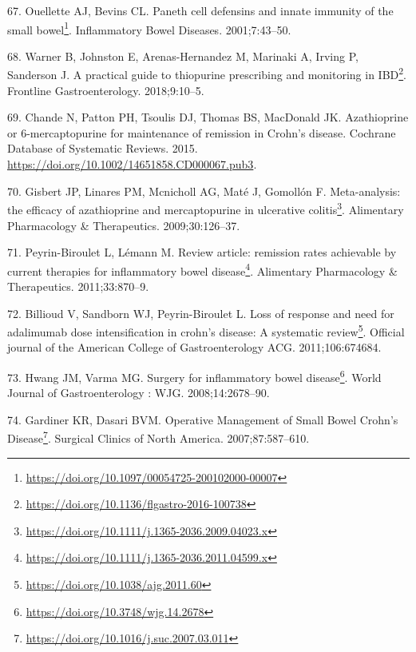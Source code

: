 \documentclass[
  12pt,
  a4paper,
  twoside,
  openright]{book}
\DeclareRobustCommand{\href}[2]{#2\footnote{\url{#1}}}
\newlength{\cslhangindent}
\newlength{\cslentryspacingunit} %
\newenvironment{CSLReferences}[2] %
 {%
  \setlength{\parindent}{0pt}
  \ifodd #1
  \let\oldpar\par
  \def\par{\hangindent=\cslhangindent\oldpar}
  \fi
  \setlength{\parskip}{#2\cslentryspacingunit}
 }%
 {}
\begin{document}
\begin{CSLReferences}{0}{0}
\leavevmode{}%
67. Ouellette AJ, Bevins CL. \href{https://doi.org/10.1097/00054725-200102000-00007}{Paneth cell defensins and innate immunity of the small bowel}. Inflammatory Bowel Diseases. 2001;7:43--50.

\leavevmode{}%
68. Warner B, Johnston E, Arenas-Hernandez M, Marinaki A, Irving P, Sanderson J. \href{https://doi.org/10.1136/flgastro-2016-100738}{A practical guide to thiopurine prescribing and monitoring in IBD}. Frontline Gastroenterology. 2018;9:10--5.

\leavevmode{}%
69. Chande N, Patton PH, Tsoulis DJ, Thomas BS, MacDonald JK. Azathioprine or 6{-}mercaptopurine for maintenance of remission in Crohn's disease. Cochrane Database of Systematic Reviews. 2015. \url{https://doi.org/10.1002/14651858.CD000067.pub3}.

\leavevmode{}%
70. Gisbert JP, Linares PM, Mcnicholl AG, Maté J, Gomollón F. \href{https://doi.org/10.1111/j.1365-2036.2009.04023.x}{Meta-analysis: the efficacy of azathioprine and mercaptopurine in ulcerative colitis}. Alimentary Pharmacology \& Therapeutics. 2009;30:126--37.

\leavevmode{}%
71. Peyrin-Biroulet L, Lémann M. \href{https://doi.org/10.1111/j.1365-2036.2011.04599.x}{Review article: remission rates achievable by current therapies for inflammatory bowel disease}. Alimentary Pharmacology \& Therapeutics. 2011;33:870--9.

\leavevmode{}%
72. Billioud V, Sandborn WJ, Peyrin-Biroulet L. \href{https://doi.org/10.1038/ajg.2011.60}{Loss of response and need for adalimumab dose intensification in crohn's disease: A systematic review}. Official journal of the American College of Gastroenterology \textbar{} ACG. 2011;106:674684.

\leavevmode{}%
73. Hwang JM, Varma MG. \href{https://doi.org/10.3748/wjg.14.2678}{Surgery for inflammatory bowel disease}. World Journal of Gastroenterology : WJG. 2008;14:2678--90.

\leavevmode{}%
74. Gardiner KR, Dasari BVM. \href{https://doi.org/10.1016/j.suc.2007.03.011}{Operative Management of Small Bowel Crohn's Disease}. Surgical Clinics of North America. 2007;87:587--610.


\end{CSLReferences}
\end{document}
